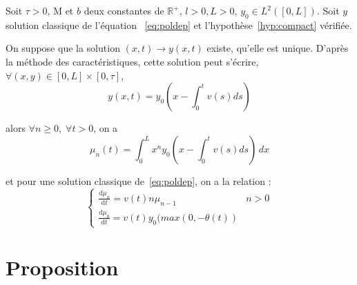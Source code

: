 \documentclass[a4paper]{article}
\newcommand{\mass}{\mathrm{M}}
\newcommand{\dep}{b}
\begin{document}
\begin{lemme}
	\label{lemmesol}
	Soit $\tau>0$, $\mass$ et $\dep$ deux constantes de $\mathbb{R}^+$, 
	$l>0, L>0$, $y_0 \in L^2([0,L])$.
	Soit $y$ solution classique de l'équation ~\eqref{eq:poldep} et l'hypothèse~\eqref{hyp:compact} vérifiée.
	
	On suppose que la solution $(x,t) \to y(x,t)$ existe, qu'elle est unique. 
	D'après la méthode des caractéristiques, cette solution peut s'écrire,
	 $\forall (x,y) \in [0,L] \times [0, \tau]$, 
	\[y(x,t) = y_0(x-\int_{0}^t v(s)ds) \]
	
	alors $\forall n \geq 0, \; \forall t>0$, on a 
	\[\mu_n(t) = \int_0^L x^n y_0(x-\int_{0}^t v(s)ds) \, dx \]
	
	et pour une solution classique de~\eqref{eq:poldep}, on a la relation : 
	\begin{equation}
		\label{eq:mmt}
		\begin{cases}
			\displaystyle \frac{\mathrm{d} \mu_n }{\mathrm{d}t} = v(t) n \mu_{n-1} & n>0 \\
			\displaystyle \frac{\mathrm{d} \mu_0 }{\mathrm{d}t} = v(t) y_0(max(0,-\theta(t))
		\end{cases}
	\end{equation}	
	
\end{lemme}
  
  
\section{Proposition}
 
\end{document}
